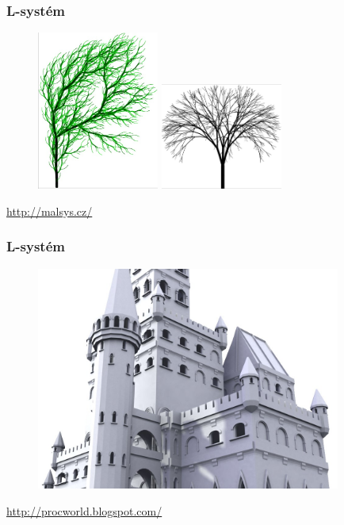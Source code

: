 \begin{frame}
\frametitle{L-systém}
	\begin{figure}[h]
		\includegraphics[width=4cm,keepaspectratio]{pics/procedural/lsystem.jpg}
		\includegraphics[width=4cm,keepaspectratio]{pics/procedural/lsystem1.jpg}
	\end{figure}
	\url{http://malsys.cz/}
\end{frame}

\begin{frame}
\frametitle{L-systém}
	\begin{figure}[h]
		\includegraphics[width=10cm,keepaspectratio]{pics/procedural/castle.jpg}
	\end{figure}
	\url{http://procworld.blogspot.com/}
\end{frame}

